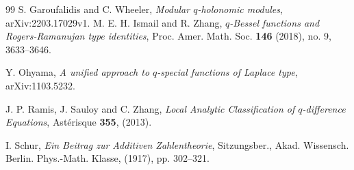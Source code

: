 \documentclass[a4paper]{article}
\numberwithin{equation}{section}
\theoremstyle{plain}
\begin{document}
\begin{thebibliography}{99}
{S. Garoufalidis and C. Wheeler}, 
{\em Modular $q$-holonomic modules}, 
{arXiv:2203.17029v1}.
{M. E. H. Ismail and R. Zhang}, 
{\em $q$-Bessel functions and Rogers-Ramanujan type identities}, 
{Proc. Amer. Math. Soc. {\bf{146}} (2018), no. 9, 3633--3646}. 



 
% 


{Y. Ohyama}, 
{\em A unified approach to $q$-special functions of Laplace type}, 
{arXiv:1103.5232}. 

{J. P. Ramis, J. Sauloy and C. Zhang}, 
{\em Local Analytic Classification of $q$-difference Equations}, 
{Ast\'{e}risque {\bf{355}}, (2013)}.

{I. Schur}, 
{\em Ein Beitrag zur Additiven Zahlentheorie}, 
{Sitzungsber., Akad. Wissensch. Berlin. Phys.-Math. Klasse, (1917), pp. 302--321}. 



\end{thebibliography}
\end{document}

